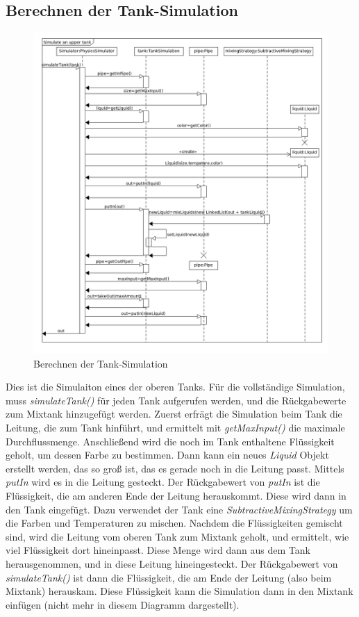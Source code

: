 \documentclass[parskip=full]{scrartcl}
\begin{document}
\subsection{Berechnen der Tank-Simulation}
\begin{figure}[H]
  \centering
  \includegraphics[scale=0.45]{design/sequence-diagrams/tank-simulation.png}
  \caption{Berechnen der Tank-Simulation}
\end{figure}
Dies ist die Simulaiton eines der oberen Tanks. Für die vollständige Simulation, muss \emph{simulateTank()} für jeden Tank aufgerufen werden,
und die Rückgabewerte zum Mixtank hinzugefügt werden. Zuerst erfrägt die Simulation beim Tank die Leitung, die zum Tank hinführt, und ermittelt
mit \emph{getMaxInput()} die maximale Durchflussmenge. Anschließend wird die noch im Tank enthaltene Flüssigkeit geholt, um dessen Farbe zu bestimmen.
Dann kann ein neues \emph{Liquid} Objekt erstellt werden, das so groß ist, das es gerade noch in die Leitung passt. Mittels \emph{putIn} wird es
in die Leitung gesteckt. Der Rückgabewert von \emph{putIn} ist die Flüssigkeit, die am anderen Ende der Leitung herauskommt. Diese wird dann in den
Tank eingefügt. Dazu verwendet der Tank eine \emph{SubtractiveMixingStrategy} um die Farben und Temperaturen zu mischen. Nachdem die Flüssigkeiten
gemischt sind, wird die Leitung vom oberen Tank zum Mixtank geholt, und ermittelt, wie viel Flüssigkeit dort hineinpasst. Diese Menge wird dann aus dem
Tank herausgenommen, und in diese Leitung hineingesteckt. Der Rückgabewert von \emph{simulateTank()} ist dann die Flüssigkeit, die am Ende der Leitung
(also beim Mixtank) herauskam. Diese Flüssigkeit kann die Simulation dann in den Mixtank einfügen (nicht mehr in diesem Diagramm dargestellt).
\end{document}
